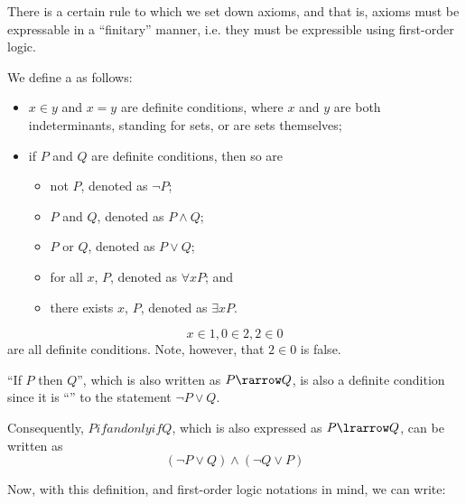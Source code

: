 \documentclass[notoc,notitlepage]{tufte-book}
\begin{document}
There is a certain rule to which we set down axioms, and that is, axioms must be expressable in a ``finitary'' manner, i.e. they must be expressible using first-order logic.

\begin{defn}
\label{defn:definite_condition}
  We define a  as follows:
  \begin{itemize}
    \item $x \in y$ and $x = y$ are definite conditions, where $x$ and $y$ are both indeterminants, standing for sets, or are sets themselves;
    \item if $P$ and $Q$ are definite conditions, then so are
      \begin{itemize}
        \item not $P$, denoted as $\neg P$;
        \item $P$ and $Q$, denoted as $P \land Q$;
        \item $P$ or $Q$, denoted as $P \lor Q$;
        \item for all $x$, $P$, denoted as $\forall x P$; and
        \item there exists $x$, $P$, denoted as $\exists x P$.
      \end{itemize}
  \end{itemize}
\end{defn}

\begin{eg}
  \begin{equation*}
    x \in 1, 0 \in 2 , 2 \in 0
  \end{equation*}
  are all definite conditions. Note, however, that $2 \in 0$ is false.
\end{eg}

\begin{note}
  ``If $P$ then $Q$'', which is also written as $P \rarrow Q$, is also a definite condition since it is ``'' to the statement $\neg P \lor Q$.

  Consequently, $P if and only if Q$, which is also expressed as $P \lrarrow Q$, can be written as
  \begin{equation*}
    (\neg P \lor Q) \land (\neg Q \lor P)
  \end{equation*}
\end{note}

Now, with this definition, and first-order logic notations in mind, we can write:
\end{document}
